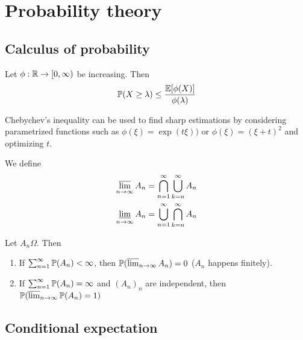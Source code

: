 \section{Probability theory}
\subsection{Calculus of probability}

\begin{thm}
  Let $\phi:\mathbb{R} \to [0,\infty) $ be increasing. Then \[\mathbb{P}(X\geq \lambda) \leq \frac{\mathbb{E}[\phi(X)]}{\phi(\lambda)}\] 
\end{thm}

\begin{remark}
    Chebychev's inequality can be used to find sharp estimations by considering parametrized functions such as $\phi(\xi) = \exp(t\xi))$ or $\phi(\xi) = (\xi+t)^2$ and optimizing $t$.
\end{remark}


\begin{defn}
    We define 
    \begin{align*}
      \varlimsup_{n\to\infty} A_n &= \bigcap_{n=1}^\infty \bigcup_{k=n}^\infty A_n \\
      \varliminf_{n\to\infty} A_n &= \bigcup_{n=1}^\infty \bigcap_{k=n}^\infty A_n
    \end{align*}
    
\end{defn}
\begin{thm}
    
\end{thm}
    
\begin{thm}
    Let $A_n  \Omega$. Then 
    \begin{enumerate}
    \item If \(\sum_{n=1}^{\infty} \mathbb{P}(A_n) < \infty\), then $\mathbb{P}(\varlimsup_{n\to\infty} A_n)=0$ ($A_n$ happens finitely).
    \item If \(\sum_{n=1}^\infty \mathbb{P}(A_n) = \infty\) and $(A_n)_n$ are independent, then $\mathbb{P}(\varlimsup_{n\to\infty} \mathbb{P}(A_n)=1)$
    \end{enumerate}
    
\end{thm}




\subsection{Conditional expectation}

